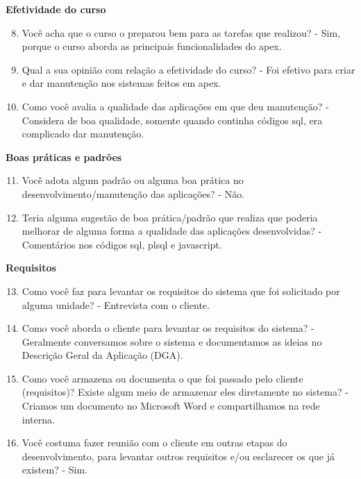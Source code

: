 \begin{apendicesenv}
\textbf{Efetividade do curso}

\begin{enumerate}
	\setcounter{enumi}{7}
	\item Você acha que o curso o preparou bem para as tarefas que realizou?\newline
	- Sim, porque o curso aborda as principais funcionalidades do apex.
	\item Qual a sua opinião com relação a efetividade do curso?\newline
	- Foi efetivo para criar e dar manutenção nos sistemas feitos em apex.
	\item Como você avalia a qualidade das aplicações em que deu manutenção?\newline
	- Considera de boa qualidade, somente quando continha códigos sql, era complicado dar manutenção.
\end{enumerate}

\textbf{Boas práticas e padrões}

\begin{enumerate}
	\setcounter{enumi}{10}
	\item Você adota algum padrão ou alguma boa prática no desenvolvimento/manutenção das
	aplicações?\newline
	- Não.
	\item Teria alguma sugestão de boa prática/padrão que realiza que poderia melhorar de
	alguma forma a qualidade das aplicações desenvolvidas?\newline
	- Comentários nos códigos sql, plsql e javascript.
\end{enumerate}

\textbf{Requisitos}

\begin{enumerate}
	\setcounter{enumi}{12}
	\item Como você faz para levantar os requisitos do sistema que foi solicitado por alguma
	unidade?\newline
	- Entrevista com o cliente.
	\item Como você aborda o cliente para levantar os requisitos do sistema?\newline
	- Geralmente conversamos sobre o sistema e documentamos as ideias no Descrição Geral da Aplicação (DGA).
	\item Como você armazena ou documenta o que foi passado pelo cliente (requisitos)? Existe
	algum meio de armazenar eles diretamente no sistema?\newline
	- Criamos um documento no Microsoft Word e compartilhamos na rede interna.
	\item Você costuma fazer reunião com o cliente em outras etapas do desenvolvimento, para
	levantar outros requisitos e/ou esclarecer os que já existem?\newline
	- Sim.
\end{enumerate}


\end{apendicesenv}
